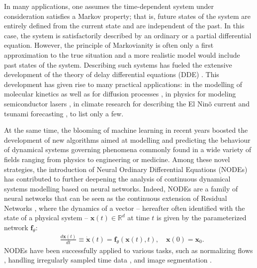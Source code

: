 In many applications, one assumes the time-dependent system under consideration satisfies a Markov property; that is, future states of the system are entirely defined from the current state and are independent of the past. In this case, the system is satisfactorily described by an ordinary or a partial differential equation. However, the principle of Markovianity is often only a first approximation to the true situation and a more realistic model would include past states of the system. Describing such systems has fueled the extensive development of the theory of delay differential equations (DDE) \citep{minorksy,Myshkis,Hale1963}. This development has given rise to many practical applications: in the modelling of molecular kinetics \citep{Roussel1996} as well as for diffusion processes \citep{Epstein1990DifferentialDE}, in physics for modeling semiconductor lasers \citep{laser}, in climate research for describing the El Nin\~o current \citep{nino,nino2} and tsunami forecasting \citep{wu2022mining}, to list only a few.

At the same time, the blooming of machine learning in recent years boosted the development of new algorithms aimed at modelling and predicting the behaviour of dynamical systems governing phenomena commonly found in a wide variety of fields ranging from physics to engineering or medicine. Among these novel strategies, the introduction of Neural Ordinary Differential Equations (NODEs) \citep{node} has contributed to further deepening the analysis of continuous dynamical systems modelling based on neural networks. Indeed, NODEs are a family of neural networks that can be seen as the continuous extension of Residual Networks \citep{resnet}, where the dynamics of a vector -- hereafter often identified with the state of a physical system -- $\mathbf{x}(t) \in \mathbb{R}^d$ at time $t$ is given by the parameterized network $\mathbf{f}_{\theta}$:
%
\begin{equation}
\begin{aligned}
&\frac{d \mathbf{x}(t)}{dt} \equiv \dot{\mathbf{x}}(t) = \mathbf{f}_{\theta}(\mathbf{x}(t),t), \quad \mathbf{x}(0) = \mathbf{x}_0.
\end{aligned}
\end{equation}
%
NODEs have been successfully applied to various tasks, such as normalizing flows \citep{node_easy_to_solve,free_nf}, handling irregularly sampled time data \citep{latent_ode,kidger_irregular}, and image segmentation \citep{node_image_segmentation}.




